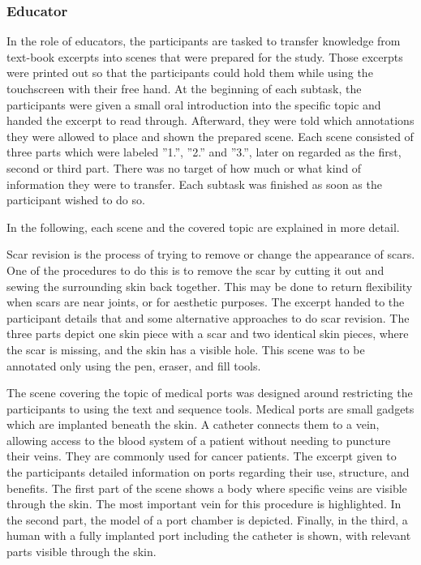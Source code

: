 \subsubsection{Educator} 

In the role of educators, the participants are tasked to transfer knowledge from text-book excerpts into scenes that were prepared for the study. Those excerpts were printed out so that the participants could hold them while using the touchscreen with their free hand. At the beginning of each subtask, the participants were given a small oral introduction into the specific topic and handed the excerpt to read through. Afterward, they were told which annotations they were allowed to place and shown the prepared scene. Each scene consisted of three parts which were labeled ''1.'', ''2.'' and ''3.'', later on regarded as the first, second or third part. There was no target of how much or what kind of information they were to transfer. Each subtask was finished as soon as the participant wished to do so.

In the following, each scene and the covered topic are explained in more detail. 

 Scar revision is the process of trying to remove or change the appearance of scars. One of the procedures to do this is to remove the scar by cutting it out and sewing the surrounding skin back together. This may be done to return flexibility when scars are near joints, or for aesthetic purposes. The excerpt handed to the participant details that and some alternative approaches to do scar revision. The three parts depict one skin piece with a scar and two identical skin pieces, where the scar is missing, and the skin has a visible hole. This scene was to be annotated only using the pen, eraser, and fill tools.

 The scene covering the topic of medical ports was designed around restricting the participants to using the text and sequence tools. Medical ports are small gadgets which are implanted beneath the skin. A catheter connects them to a vein, allowing  access to the blood system of a patient without needing to puncture their veins. They are commonly used for cancer patients. The excerpt given to the participants detailed information on ports regarding their use, structure, and benefits. The first part of the scene shows a body where specific veins are visible through the skin. The most important vein for this procedure is highlighted. In the second part, the model of a port chamber is depicted. Finally, in the third, a human with a fully implanted port including the catheter is shown, with relevant parts visible through the skin.

